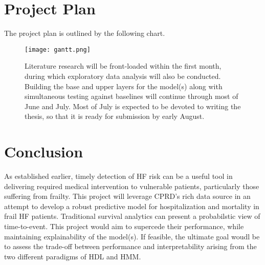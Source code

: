 \documentclass[%
 reprint,
 amsmath,amssymb,
 aps,
 nofootinbib,
]{revtex4-2}
\theoremstyle{definition}
\begin{document}
\section{\label{plan}Project Plan}
The project plan is outlined by the following chart.\\

\begin{figure}[H]
\centering
\texttt{[image: gantt.png]}
\caption{\label{fig:gantt} Literature research will be front-loaded within the first month, during which exploratory data analysis will also be conducted. Building the base and upper layers for the model(s) along with simultaneous testing against baselines will continue through most of June and July. Most of July is expected to be devoted to writing the thesis, so that it is ready for submission by early August.}
\end{figure}

\section{\label{c}Conclusion}
As established earlier, timely detection of HF risk can be a useful tool in delivering required medical intervention to vulnerable patients, particularly those suffering from frailty. This project will leverage CPRD's rich data source in an attempt to develop a robust predictive model for hospitalization and mortality in frail HF patients. Traditional survival analytics can present a probabilstic view of time-to-event. This project would aim to supercede their performance, while maintaining explainability of the model(s). If feasible, the ultimate goal woudl be to assess the trade-off between performance and interpretability arising from the two different paradigms of HDL and HMM. 

\cite{*}

%
\end{document}
